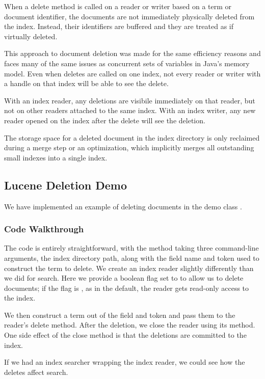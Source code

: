 When a delete method is called on a reader or writer based on a term
or document identifier, the documents are not immediately physically
deleted from the index.  Instead, their identifiers are buffered and
they are treated as if virtually deleted.  

This approach to document deletion was made for the same efficiency
reasons and faces many of the same issues as concurrent sets of
variables in Java's memory model.  Even when deletes are called on one
index, not every reader or writer with a handle on that index will be
able to see the delete.

With an index reader, any deletions are visibile immediately on that
reader, but not on other readers attached to the same index.  With
an index writer, any new reader opened on the index after the
delete will see the deletion.

The storage space for a deleted document in the index directory is
only reclaimed during a merge step or an optimization, which
implicitly merges all outstanding small indexes into a single index.

\subsection{Lucene Deletion Demo}

We have implemented an example of deleting documents in the 
demo class .

\subsubsection{Code Walkthrough}

The code is entirely straightforward, with the  method
taking three command-line arguments, the index directory path, along
with the field name and token used to construct the term to delete.
%
%
We create an index reader slightly differently than we did for
search.  Here we provide a boolean flag set to  to
allow us to delete documents; if the flag is , as in
the default, the reader gets read-only access to the index.

We then construct a term out of the field and token and pass them to
the reader's delete method.  After the deletion, we close the reader
using its  method.  One side effect of the close
method is that the deletions are committed to the index.

If we had an index searcher wrapping the index reader, we could
see how the deletes affect search.

